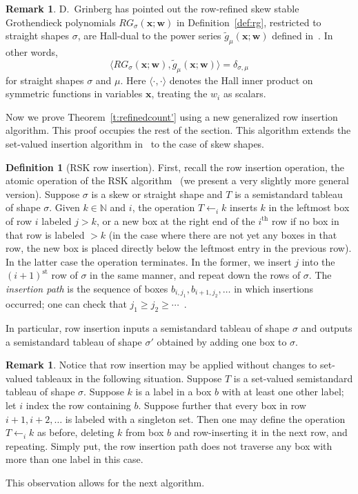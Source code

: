 \documentclass[11pt]{article}
\theoremstyle{definition}
\newtheorem{defi}[theorem]{Definition}
\newtheorem{rema}[theorem]{Remark}
\newcommand{\NN}{\mathbb{N}}
\begin{document}
\begin{rema}\label{rem:darij}
D.~Grinberg has pointed out the row-refined skew stable Grothendieck polynomials $RG_\sigma(\mathbf{x};\mathbf{w})$ in Definition~\ref{def:rg}, restricted to straight shapes $\sigma$, are Hall-dual to the power series $\tilde{g}_{\mu}(\mathbf{x};\mathbf{w})$ defined in~\cite{galashin-grinberg-liu-refined}. In other words, 
\[
\langle RG_\sigma(\mathbf{x};\mathbf{w}), \tilde{g}_\mu(\mathbf{x};\mathbf{w})\rangle = \delta_{\sigma,\mu}
\]
for straight shapes $\sigma$ and $\mu$. Here $\langle\cdot,\cdot\rangle$ denotes the Hall inner product on symmetric functions in variables $\mathbf{x}$, treating the $w_i$ as scalars. 
\end{rema}






Now we prove Theorem~\ref{t:refinedcount'} using a new generalized row insertion algorithm. This proof occupies the rest of the section. This algorithm extends the set-valued insertion algorithm in~\cite{bandlow-morse-combinatorial} to the case of skew shapes. 

\begin{defi}[RSK row insertion]\label{def:rsk} First, recall the row insertion operation, the atomic operation of the RSK algorithm~\cite[\S~7.11]{ec2} (we present a very slightly more general version). Suppose $\sigma$ is a skew or straight shape and $T$ is a semistandard tableau of shape $\sigma$. Given $k\in \NN$ and $i$, the operation $T\leftarrow_i k$ inserts $k$ in the leftmost box of row $i$ labeled $j>k$, or a new box at the right end of the $i^\text{th}$ row if no box in that row is labeled $>k$ (in the case where there are not yet any boxes in that row, the new box is placed directly below the leftmost entry in the previous row). In the latter case the operation terminates. In the former, we insert $j$ into the $(i+1)^\text{st}$ row of $\sigma$ in the same manner, and repeat down the rows of $\sigma$. The \emph{insertion path} is the sequence of boxes $b_{i,j_1},b_{i+1,j_2},\ldots$ in which insertions occurred; one can check that $j_1 \ge j_2 \ge \cdots$~\cite[Lemma~7.11.2]{ec2}.
\end{defi}

In particular, row insertion inputs a semistandard tableau of shape $\sigma$ and outputs a semistandard tableau of shape $\sigma'$ obtained by adding one box to $\sigma$.

\begin{rema}
Notice that row insertion may be applied without changes to set-valued tableaux in the following situation. Suppose $T$ is a set-valued semistandard tableau of shape $\sigma$. Suppose $k$ is a label in a box $b$ with at least one other label; let $i$ index the row containing $b$. Suppose further that every box in row $i+1,i+2,\ldots$ is labeled with a singleton set. Then one may define the operation $T\leftarrow_i k$ as before, deleting $k$ from box $b$ and row-inserting it in the next row, and repeating. Simply put, the row insertion path does not traverse any box with more than one label in this case.

This observation allows for the next algorithm.
\end{rema}
\end{document}
